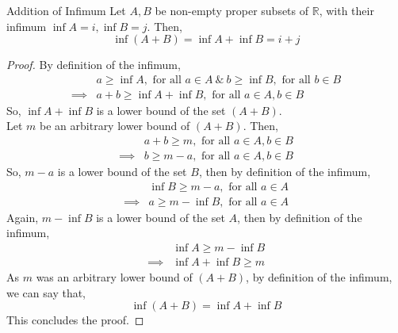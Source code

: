 \begin{Theorem}{Addition of Infimum}\label{addition_infimum}
    Let $A, B$ be non-empty proper subsets of $\mathbb{R}$, with their infimum $\inf A= i,\inf B=j$. Then, $$\inf (A+B)=\inf A+\inf B=i+j$$
\end{Theorem}
\begin{proof}
    By definition of the infimum,
    \begin{align*}
        & a\geq\inf A,\text{ for all }a\in A\ \&\ b\geq\inf B,\text{ for all }b\in B\\
        \implies &a+b\geq\inf A+\inf B,\text{ for all }a\in A, b\in B
    \end{align*}
    So, $\inf A+\inf B$ is a lower bound of the set $(A+B)$.\\
    Let $m$ be an arbitrary lower bound of $(A+B)$. Then,
    \begin{align*}
        &a+b\geq m,\text{ for all }a\in A,b\in B\\
        \implies&b\geq m-a,\text{ for all }a\in A,b\in B
    \end{align*}
    So, $m-a$ is a lower bound of the set $B$, then by definition of the infimum,
    \begin{align*}
        &\inf B\geq m-a,\text{ for all }a\in A\\
        \implies&a\geq m-\inf B,\text{ for all }a\in A
    \end{align*}
    Again, $m-\inf B$ is a lower bound of the set $A$, then by definition of the infimum,
    \begin{align*}
        &\inf A\geq m-\inf B\\
        \implies&\inf A+\inf B\geq m
    \end{align*}
    As $m$ was an arbitrary lower bound of $(A+B)$, by definition of the infimum, we can say that, $$\inf(A+B)=\inf A+\inf B$$ This concludes the proof.
\end{proof}


